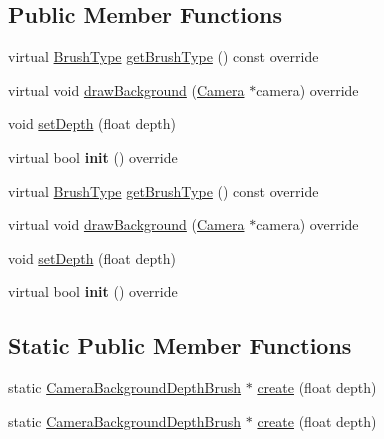 \subsection*{Public Member Functions}
\begin{DoxyCompactItemize}
\item 
virtual \hyperlink{classCameraBackgroundBrush_acb83e8d05e7ab9386c041d22c444760f}{Brush\+Type} \hyperlink{classCameraBackgroundDepthBrush_ad4cc258ce1a1cd3ac43ea0d2580409d5}{get\+Brush\+Type} () const override
\item 
virtual void \hyperlink{classCameraBackgroundDepthBrush_afe438cdd7dbcf77d6421ec50224579d1}{draw\+Background} (\hyperlink{classCamera}{Camera} $\ast$camera) override
\item 
void \hyperlink{classCameraBackgroundDepthBrush_af2ad2cf604a43238be0b639e2b5a4079}{set\+Depth} (float depth)
\item 
\mbox{\label{classCameraBackgroundDepthBrush_a4fb176812eea53e6e385a4df278ca4df}} 
virtual bool {\bfseries init} () override
\item 
virtual \hyperlink{classCameraBackgroundBrush_acb83e8d05e7ab9386c041d22c444760f}{Brush\+Type} \hyperlink{classCameraBackgroundDepthBrush_ad4cc258ce1a1cd3ac43ea0d2580409d5}{get\+Brush\+Type} () const override
\item 
virtual void \hyperlink{classCameraBackgroundDepthBrush_aa87e44c303dcf8e2560ee56d5c8fee58}{draw\+Background} (\hyperlink{classCamera}{Camera} $\ast$camera) override
\item 
void \hyperlink{classCameraBackgroundDepthBrush_af2ad2cf604a43238be0b639e2b5a4079}{set\+Depth} (float depth)
\item 
\mbox{\label{classCameraBackgroundDepthBrush_a513a13b15f7efdcc82a55eee840616b9}} 
virtual bool {\bfseries init} () override
\end{DoxyCompactItemize}
\subsection*{Static Public Member Functions}
\begin{DoxyCompactItemize}
\item 
static \hyperlink{classCameraBackgroundDepthBrush}{Camera\+Background\+Depth\+Brush} $\ast$ \hyperlink{classCameraBackgroundDepthBrush_a4dcbc6c0ce0041ebd4b756da61772340}{create} (float depth)
\item 
static \hyperlink{classCameraBackgroundDepthBrush}{Camera\+Background\+Depth\+Brush} $\ast$ \hyperlink{classCameraBackgroundDepthBrush_a98c7ee137600abb4dd07387bade6687e}{create} (float depth)
\end{DoxyCompactItemize}
